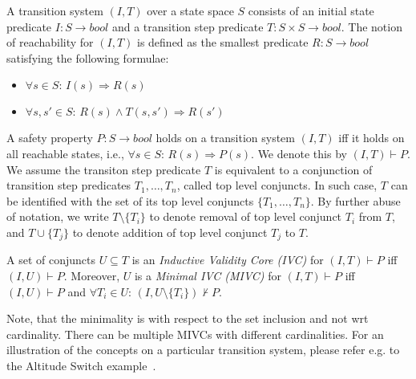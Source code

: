 A transition system $(I,T)$ over a state space $S$ consists of an initial state predicate $I : S \rightarrow bool$ and a transition step predicate $T : S \times S \rightarrow bool$. The notion of reachability for $(I, T)$ is defined as the smallest predicate $R : S \rightarrow bool$ satisfying the following formulae:

\vspace{-5pt}
\begin{itemize}
	\item[] $\forall s \in S: \, I(s) \Rightarrow R(s)$
	\item[] $\forall s, s' \in S: \, R(s) \wedge T(s, s') \Rightarrow R(s')$
\end{itemize}

\vspace{-5pt}
A safety property $P: S \rightarrow bool$ holds on a transition system $(I, T)$ iff it holds on all reachable states, i.e., $\forall s \in S: \, R(s) \Rightarrow P(s)$. We denote this by $(I, T) \vdash P$. We assume
the transiton step predicate $T$ is equivalent to   a conjunction of transition step predicates $T_1, \ldots, T_n$,  called top level conjuncts.
In such case, $T$ can be identified with the set of its top level conjuncts $\{ T_1, \ldots, T_n\}$. By further abuse of notation, we write $T \setminus \{ T_i \}$ to denote removal of top level conjunct $T_i$ from $T$, and $T \cup \{ T_j\}$ to denote addition of top level conjunct $T_j$ to $T$.


\begin{definition}
A set of conjuncts $U \subseteq T$ is an \emph{ Inductive Validity Core (IVC)} for $(I, T) \vdash P$ iff $(I, U) \vdash P$. Moreover, $U$ is a \emph{Minimal IVC (MIVC)} for $(I, T) \vdash P$ iff $(I, U) \vdash P$ and $\forall T_i \in U: \, (I, U \setminus \{ T_i\}) \nvdash P$.
\end{definition}

Note, that the minimality is with respect to the set inclusion and not wrt cardinality. There can be multiple MIVCs with different cardinalities.
For an illustration of the concepts on a particular transition system, please refer e.g. to the Altitude Switch example~\cite{Ghass17AllIVCs}.




